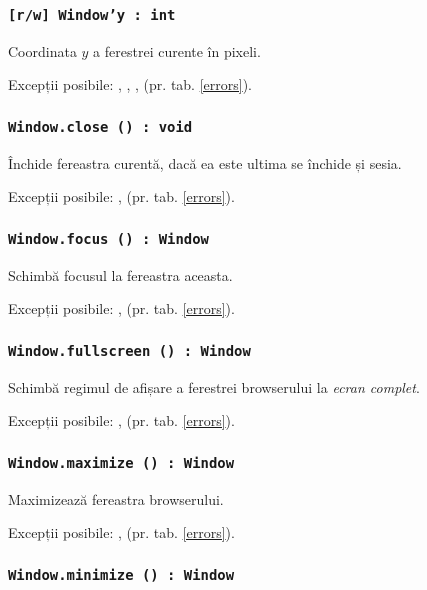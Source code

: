 \subsubsection{\texttt{[r/w] Window'y : int}}

Coordinata $y$ a ferestrei curente în pixeli.

Excepții posibile: , , ,  (pr. tab. \ref{errors}).

\subsubsection{\texttt{Window.close () : void}}

Închide fereastra curentă, dacă ea este ultima se închide și sesia.

Excepții posibile: ,  (pr. tab. \ref{errors}).

\subsubsection{\texttt{Window.focus () : Window}}

Schimbă focusul la fereastra aceasta.

Excepții posibile: ,  (pr. tab. \ref{errors}).

\subsubsection{\texttt{Window.fullscreen () : Window}}

Schimbă regimul de afișare a ferestrei browserului la \textit{ecran complet}.

Excepții posibile: ,  (pr. tab. \ref{errors}).

\subsubsection{\texttt{Window.maximize () : Window}}

Maximizează fereastra browserului.

Excepții posibile: ,  (pr. tab. \ref{errors}).

\subsubsection{\texttt{Window.minimize () : Window}}

